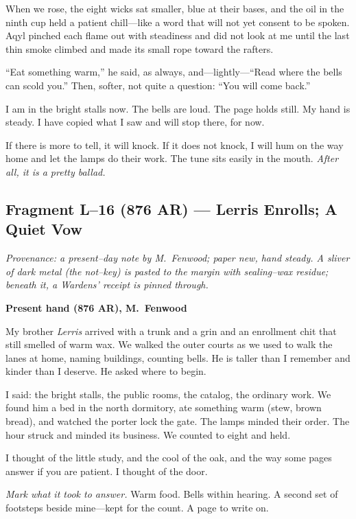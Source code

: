\documentclass[11pt]{article}
\numberwithin{equation}{section} %
\theoremstyle{plain} %
\theoremstyle{definition} %
\theoremstyle{remark} %
\begin{document}
When we rose, the eight wicks sat smaller, blue at their bases, and the oil in the ninth cup held a patient chill—like a word that will not yet consent to be spoken. Aqyl pinched each flame out with steadiness and did not look at me until the last thin smoke climbed and made its small rope toward the rafters.

“Eat something warm,” he said, as always, and—lightly—“Read where the bells can scold you.” Then, softer, not quite a question: “You will come back.”

I am in the bright stalls now. The bells are loud. The page holds still. My hand is steady. I have copied what I saw and will stop there, for now.

If there is more to tell, it will knock. If it does not knock, I will hum on the way home and let the lamps do their work. The tune sits easily in the mouth. \emph{After all, it is a pretty ballad.}

\subsection{Fragment L--16 (876 AR) — Lerris Enrolls; A Quiet Vow}
\label{frag:l16}

\noindent\textit{Provenance: a present–day note by M.\ Fenwood; paper new, hand steady. A sliver of dark metal (the not–key) is pasted to the margin with sealing–wax residue; beneath it, a Wardens’ receipt is pinned through.}

\medskip
\noindent\textbf{Present hand (876 AR), M.\ Fenwood}

My brother \textit{Lerris} arrived with a trunk and a grin and an enrollment chit that still smelled of warm wax. We walked the outer courts as we used to walk the lanes at home, naming buildings, counting bells. He is taller than I remember and kinder than I deserve. He asked where to begin.

I said: the bright stalls, the public rooms, the catalog, the ordinary work. We found him a bed in the north dormitory, ate something warm (stew, brown bread), and watched the porter lock the gate. The lamps minded their order. The hour struck and minded its business. We counted to eight and held.

I thought of the little study, and the cool of the oak, and the way some pages answer if you are patient. I thought of the door.

\medskip
\noindent\textit{Mark what it took to answer.} Warm food. Bells within hearing. A second set of footsteps beside mine—kept for the count. A page to write on.
\end{document}
